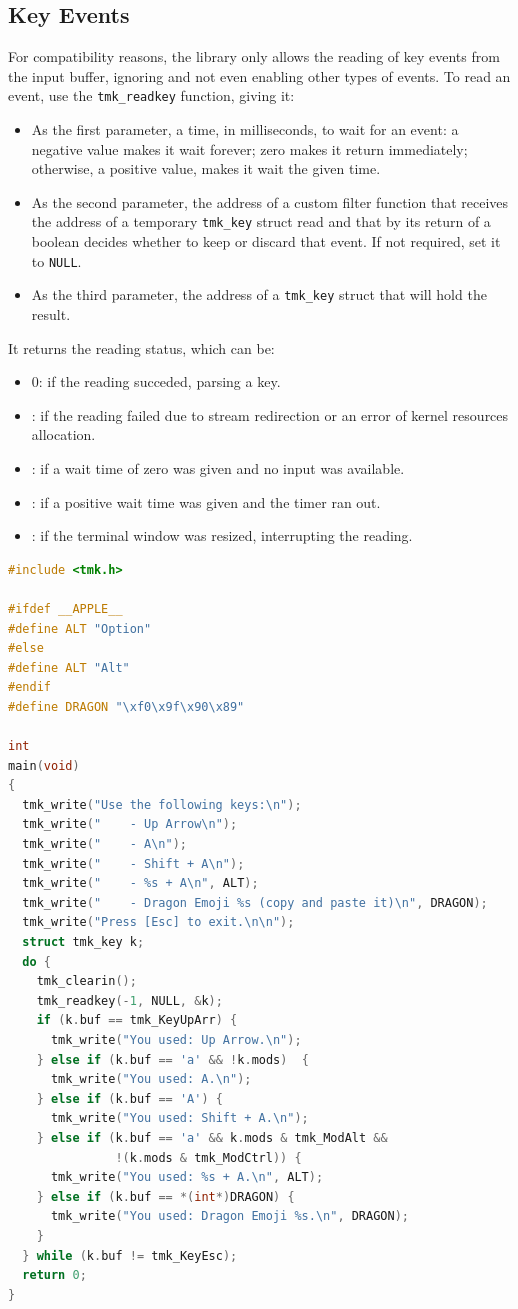\documentclass{report}
\begin{document}
\subsection{Key Events}
For compatibility reasons, the library only allows the reading of key events from the input buffer, ignoring and not even enabling other types of events. To read an event, use the \texttt{tmk\_readkey} function, giving it:
\begin{itemize}
  \item As the first parameter, a time, in milliseconds, to wait for an event: a negative value makes it wait forever; zero makes it return immediately; otherwise, a positive value, makes it wait the given time.
  \item As the second parameter, the address of a custom filter function that receives the address of a temporary \texttt{tmk\_key} struct read and that by its return of a boolean decides whether to keep or discard that event. If not required, set it to \texttt{NULL}.
  \item As the third parameter, the address of a \texttt{tmk\_key} struct that will hold the result.
\end{itemize}
It returns the reading status, which can be:
\begin{itemize}
  \item 0: if the reading succeded, parsing a key.
  \item {}: if the reading failed due to stream redirection or an error of kernel resources allocation.
  \item {}: if a wait time of zero was given and no input was available.
  \item {}: if a positive wait time was given and the timer ran out.
  \item {}: if the terminal window was resized, interrupting the reading.
\end{itemize}
\begin{lstlisting}[language=c,caption=an example that parse some keys.]
#include <tmk.h>

#ifdef __APPLE__
#define ALT "Option"
#else
#define ALT "Alt"
#endif
#define DRAGON "\xf0\x9f\x90\x89"

int
main(void)
{
  tmk_write("Use the following keys:\n");
  tmk_write("    - Up Arrow\n");
  tmk_write("    - A\n");
  tmk_write("    - Shift + A\n");
  tmk_write("    - %s + A\n", ALT);
  tmk_write("    - Dragon Emoji %s (copy and paste it)\n", DRAGON);
  tmk_write("Press [Esc] to exit.\n\n");
  struct tmk_key k;
  do {
    tmk_clearin();
    tmk_readkey(-1, NULL, &k);
    if (k.buf == tmk_KeyUpArr) {
      tmk_write("You used: Up Arrow.\n");
    } else if (k.buf == 'a' && !k.mods)  {
      tmk_write("You used: A.\n");
    } else if (k.buf == 'A') {
      tmk_write("You used: Shift + A.\n");
    } else if (k.buf == 'a' && k.mods & tmk_ModAlt &&
               !(k.mods & tmk_ModCtrl)) {
      tmk_write("You used: %s + A.\n", ALT);
    } else if (k.buf == *(int*)DRAGON) {
      tmk_write("You used: Dragon Emoji %s.\n", DRAGON);
    }
  } while (k.buf != tmk_KeyEsc);
  return 0;
}
\end{lstlisting}
\end{document}
